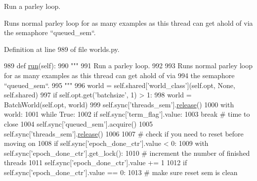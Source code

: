 \begin{DoxyVerb}Run a parley loop.

Runs normal parley loop for as many examples as this thread can get ahold of via
the semaphore ``queued_sem``.
\end{DoxyVerb}
 

Definition at line 989 of file worlds.\+py.


\begin{DoxyCode}
989     \textcolor{keyword}{def }\hyperlink{namespaceparlai_1_1agents_1_1tfidf__retriever_1_1build__tfidf_a0d8cca9dbdf0fa23d25e81ec2a96b347}{run}(self):
990         \textcolor{stringliteral}{"""}
991 \textcolor{stringliteral}{        Run a parley loop.}
992 \textcolor{stringliteral}{}
993 \textcolor{stringliteral}{        Runs normal parley loop for as many examples as this thread can get ahold of via}
994 \textcolor{stringliteral}{        the semaphore ``queued\_sem``.}
995 \textcolor{stringliteral}{        """}
996         world = self.shared[\textcolor{stringliteral}{'world\_class'}](self.opt, \textcolor{keywordtype}{None}, self.shared)
997         \textcolor{keywordflow}{if} self.opt.get(\textcolor{stringliteral}{'batchsize'}, 1) > 1:
998             world = BatchWorld(self.opt, world)
999         self.sync[\textcolor{stringliteral}{'threads\_sem'}].\hyperlink{namespaceconf_a325dc746d8bf05c54d26351c35a21d90}{release}()
1000         with world:
1001             \textcolor{keywordflow}{while} \textcolor{keyword}{True}:
1002                 \textcolor{keywordflow}{if} self.sync[\textcolor{stringliteral}{'term\_flag'}].value:
1003                     \textcolor{keywordflow}{break}  \textcolor{comment}{# time to close}
1004                 self.sync[\textcolor{stringliteral}{'queued\_sem'}].acquire()
1005                 self.sync[\textcolor{stringliteral}{'threads\_sem'}].\hyperlink{namespaceconf_a325dc746d8bf05c54d26351c35a21d90}{release}()
1006 
1007                 \textcolor{comment}{# check if you need to reset before moving on}
1008                 \textcolor{keywordflow}{if} self.sync[\textcolor{stringliteral}{'epoch\_done\_ctr'}].value < 0:
1009                     with self.sync[\textcolor{stringliteral}{'epoch\_done\_ctr'}].get\_lock():
1010                         \textcolor{comment}{# increment the number of finished threads}
1011                         self.sync[\textcolor{stringliteral}{'epoch\_done\_ctr'}].value += 1
1012                         \textcolor{keywordflow}{if} self.sync[\textcolor{stringliteral}{'epoch\_done\_ctr'}].value == 0:
1013                             \textcolor{comment}{# make sure reset sem is clean}

\end{DoxyCode}
